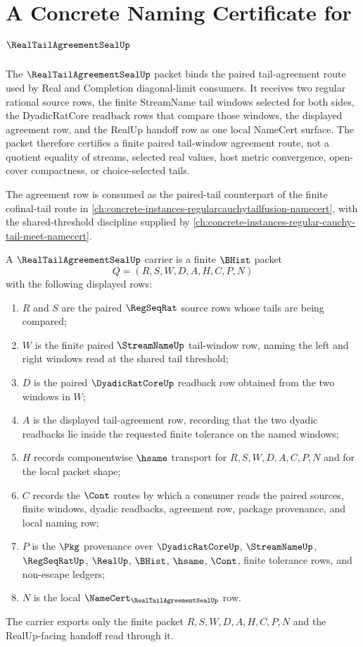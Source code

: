 \chapter{A Concrete Naming Certificate for $\RealTailAgreementSealUp$}
\label{ch:concrete-instances-realtailagreementseal-namecert}

The $\RealTailAgreementSealUp$ packet binds the paired tail-agreement route used by Real and Completion diagonal-limit consumers. It receives two regular rational source rows, the finite StreamName tail windows selected for both sides, the DyadicRatCore readback rows that compare those windows, the displayed agreement row, and the RealUp handoff row as one local NameCert surface. The packet therefore certifies a finite paired tail-window agreement route, not a quotient equality of streams, selected real values, host metric convergence, open-cover compactness, or choice-selected tails.

The agreement row is consumed as the paired-tail counterpart of the finite cofinal-tail route in \autoref{ch:concrete-instances-regularcauchytailfusion-namecert}, with the shared-threshold discipline supplied by \autoref{ch:concrete-instances-regular-cauchy-tail-meet-namecert}.

\begin{definition}
\label{def:real-tail-agreement-seal-carrier}
A $\RealTailAgreementSealUp$ carrier is a finite $\BHist$ packet
$$
Q=(R,S,W,D,A,H,C,P,N)
$$
with the following displayed rows:
\begin{enumerate}
\item $R$ and $S$ are the paired $\RegSeqRat$ source rows whose tails are being compared;
\item $W$ is the finite paired $\StreamNameUp$ tail-window row, naming the left and right windows read at the shared tail threshold;
\item $D$ is the paired $\DyadicRatCoreUp$ readback row obtained from the two windows in $W$;
\item $A$ is the displayed tail-agreement row, recording that the two dyadic readbacks lie inside the requested finite tolerance on the named windows;
\item $H$ records componentwise $\hsame$ transport for $R,S,W,D,A,C,P,N$ and for the local packet shape;
\item $C$ records the $\Cont$ routes by which a consumer reads the paired sources, finite windows, dyadic readbacks, agreement row, package provenance, and local naming row;
\item $P$ is the $\Pkg$ provenance over $\DyadicRatCoreUp$, $\StreamNameUp$, $\RegSeqRatUp$, $\RealUp$, $\BHist$, $\hsame$, $\Cont$, finite tolerance rows, and non-escape ledgers;
\item $N$ is the local $\NameCert_{\RealTailAgreementSealUp}$ row.
\end{enumerate}
The carrier exports only the finite packet $R,S,W,D,A,H,C,P,N$ and the RealUp-facing handoff read through it.
\end{definition}

